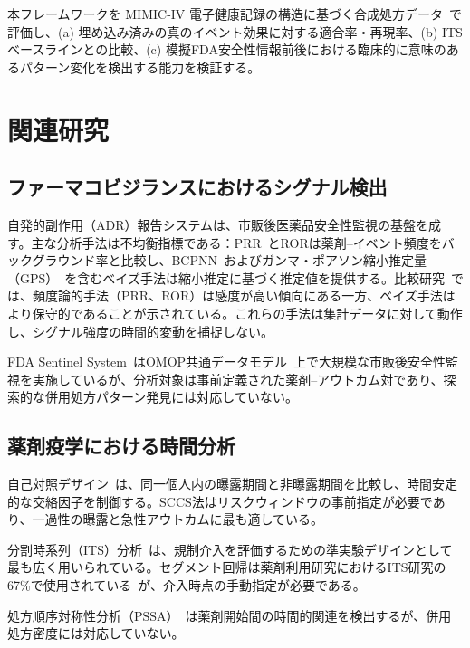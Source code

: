 \documentclass[11pt]{article}
\begin{document}
本フレームワークを MIMIC-IV 電子健康記録の構造に基づく合成処方データ~\citep{johnson2023mimiciv}で評価し、(a) 埋め込み済みの真のイベント効果に対する適合率・再現率、(b) ITSベースラインとの比較、(c) 模擬FDA安全性情報前後における臨床的に意味のあるパターン変化を検出する能力を検証する。

\section{関連研究}\label{sec:related}

\subsection{ファーマコビジランスにおけるシグナル検出}

自発的副作用（ADR）報告システムは、市販後医薬品安全性監視の基盤を成す。主な分析手法は不均衡指標である：PRR~\citep{evans2001prr}とRORは薬剤--イベント頻度をバックグラウンド率と比較し、BCPNN~\citep{bate1998bcpnn}およびガンマ・ポアソン縮小推定量（GPS）~\citep{dumouchel1999gps}を含むベイズ手法は縮小推定に基づく推定値を提供する。比較研究~\citep{lee2020comparison}では、頻度論的手法（PRR、ROR）は感度が高い傾向にある一方、ベイズ手法はより保守的であることが示されている。これらの手法は集計データに対して動作し、シグナル強度の時間的変動を捕捉しない。

FDA Sentinel System~\citep{platt2012sentinel}はOMOP共通データモデル~\citep{hripcsak2015omop}上で大規模な市販後安全性監視を実施しているが、分析対象は事前定義された薬剤--アウトカム対であり、探索的な併用処方パターン発見には対応していない。

\subsection{薬剤疫学における時間分析}

自己対照デザイン~\citep{cadarette2021sccs,petersen2016selfcontrolled}は、同一個人内の曝露期間と非曝露期間を比較し、時間安定的な交絡因子を制御する。SCCS法はリスクウィンドウの事前指定が必要であり、一過性の曝露と急性アウトカムに最も適している。

分割時系列（ITS）分析~\citep{bernal2017its,jandoc2015its}は、規制介入を評価するための準実験デザインとして最も広く用いられている。セグメント回帰は薬剤利用研究におけるITS研究の67\%で使用されている~\citep{jandoc2015its}が、介入時点の手動指定が必要である。

処方順序対称性分析（PSSA）~\citep{hallas1996pssa,pratt2015pssa}は薬剤開始間の時間的関連を検出するが、併用処方密度には対応していない。
\end{document}
